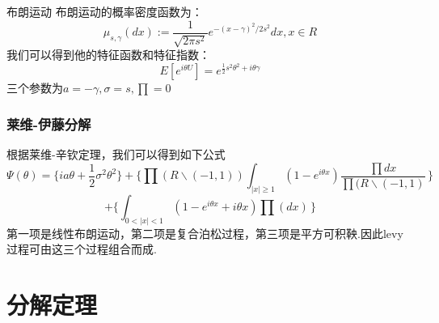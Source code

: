 \documentclass{beamer}
\begin{document}
\begin{frame}
布朗运动\newline\newline
布朗运动的概率密度函数为：\[\mu_{s,\gamma}(dx):=\frac{1}{\sqrt{2\pi s^{2}}}e^{-(x-\gamma)^{2}/2s^{2}}dx ,x \in R\]我们可以得到他的特征函数和特征指数：\[E[e^{i\theta U}]=e^{\frac{1}{2}s^{2}\theta^{2}+i\theta\gamma}\]三个参数为$a=-\gamma,\sigma=s,\prod=0$

\end{frame}

\begin{frame}
\frametitle{莱维-伊藤分解}


根据莱维-辛钦定理，我们可以得到如下公式\[\Psi(\theta)=\{ia\theta+\frac{1}{2}\sigma^{2}\theta^{2}\}+\{\prod(R\backslash(-1,1))\int_{|x|\geq1}(1-e^{i\theta x})\frac{\prod{dx}}{\prod(R\backslash(-1,1)} \,\}\]\newline\[+\{\int_{0<|x|<1}(1-e^{i\theta x}+i\theta x)\prod(dx) \,\} \]
第一项是线性布朗运动，第二项是复合泊松过程，第三项是平方可积鞅.因此levy过程可由这三个过程组合而成.

\end{frame}



\section{分解定理}\fontsize{10pt}{10pt}\selectfont

\end{document}
